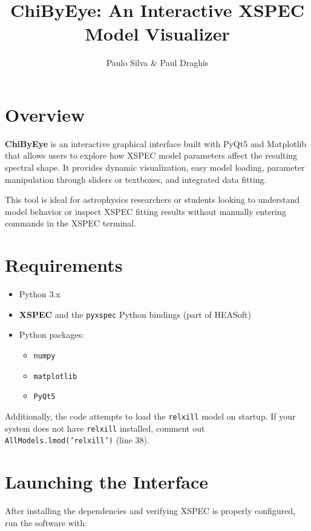 \documentclass[11pt]{article}
\title{\textbf{ChiByEye: An Interactive XSPEC Model Visualizer}}
\author{Paulo Silva \& Paul Draghis}
\date{}
\begin{document}
\maketitle

\section*{Overview}

\textbf{ChiByEye} is an interactive graphical interface built with PyQt5 and Matplotlib that allows users to explore how XSPEC model parameters affect the resulting spectral shape. It provides dynamic visualization, easy model loading, parameter manipulation through sliders or textboxes, and integrated data fitting.

This tool is ideal for astrophysics researchers or students looking to understand model behavior or inspect XSPEC fitting results without manually entering commands in the XSPEC terminal.

\section*{Requirements}

\begin{itemize}
    \item Python 3.x
    \item \textbf{XSPEC} and the \texttt{pyxspec} Python bindings (part of HEASoft)
    \item Python packages:
    \begin{itemize}
        \item \texttt{numpy}
        \item \texttt{matplotlib}
        \item \texttt{PyQt5}
    \end{itemize}
\end{itemize}

\noindent
Additionally, the code attempts to load the \texttt{relxill} model on startup. If your system does not have \texttt{relxill} installed, comment out \texttt{AllModels.lmod('relxill')} (line 38).

\section*{Launching the Interface}

After installing the dependencies and verifying XSPEC is properly configured, run the software with:
\end{document}
